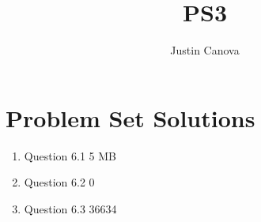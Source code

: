 \documentclass{article}
\title{PS3}
\author{Justin Canova}
\begin{document}
\maketitle


\section{Problem Set Solutions}
\begin{enumerate}
\item Question 6.1  5 MB 
\item Question 6.2  0
\item Question 6.3  36634
\end{enumerate}
\end{document}
